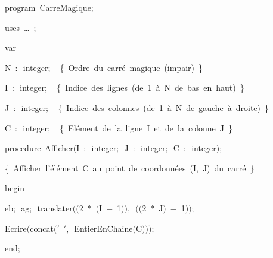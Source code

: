 
{
\parindent {}
\medskip

\carrenoir
\vspace{\neglskip}\mbox{\blc  \idt  \mcl program\idt \ CarreMagique$;$
}\par 
\vspace{\neglskip}\mbox{\blc \blk\idt \mcl uses\idt \ \ldots\ $;$
}\par 
\pagebreak[3] 
\vspace{\neglskip}\mbox{\blc  \blk\idt  \mcl var\idt }\par 
\vspace{\neglskip}\mbox{\blc  \blk\blk\idt  N\ $:$\ integer$;$\ \ \cmt  \{\ Ordre\ du\ carré\ magique\ (impair)\ \}\idt }\par 
\vspace{\neglskip}\mbox{\blc  \blk\blk\idt  I\ $:$\ integer$;$\ \ \cmt  \{\ Indice\ des\ lignes\ (de\ 1\ à\ N\ de\ bas\ en\ haut)\ \}\idt }\par 
\vspace{\neglskip}\mbox{\blc  \blk\blk\idt  J\ $:$\ integer$;$\ \ \cmt  \{\ Indice\ des\ colonnes\ (de\ 1\ à\ N\ de\ gauche\ à\ droite)\ \}\idt }\par 
\vspace{\neglskip}\mbox{\blc  \blk\blk\idt  C\ $:$\ integer$;$\ \ \cmt  \{\ Elément\ de\ la\ ligne\ I\ et\ de\ la\ colonne\ J\ \}\idt }\par 
\medskip

\pagebreak[3] 
\vspace{\neglskip}\mbox{\blc  \blk\idt  \mcl procedure\idt \ Afficher$($I\ $:$\ integer$;$\ J\ $:$\ integer$;$\ C\ $:$\ integer$)$$;$}\par 
\vspace{\neglskip}\mbox{\blc  \blk\blk\idt  \cmt  \{\ Afficher\ l{'}élément\ C\ au\ point\ de\ coordonnées\ (I,\ J)\ du\ carré\ \}\idt }\par 
\vspace{\neglskip}\mbox{\blc  \blk\idt  \mcl begin\idt }\par 
\vspace{\neglskip}\mbox{\blc  \blk\blk\idt  eb$;$\ ag$;$\ translater$($$($2\ $\ast$\ $($I\ $-$\ 1$)$$)$$,$\ $($$($2\ $\ast$\ J$)$\ $-$\ 1$)$$)$$;$}\par 
\vspace{\neglskip}\mbox{\blc  \blk\blk\idt  Ecrire$($concat$($\cha $\scriptstyle '$\ \idt $\scriptstyle '$$,$\ EntierEnChaine$($C$)$$)$$)$$;$}\par 
\vspace{\neglskip}\mbox{\blc  \blk\idt  \mcl end\idt $;$}\par 
\medskip

}
